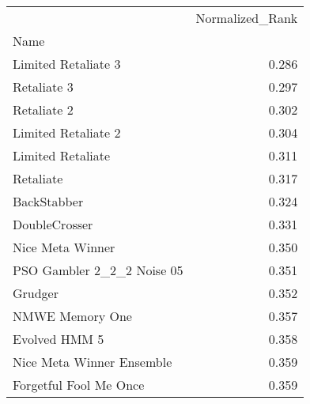 \begin{tabular}{lr}
\toprule
{} &  Normalized\_Rank \\
Name                       &                  \\
\midrule
Limited Retaliate 3        &            0.286 \\
Retaliate 3                &            0.297 \\
Retaliate 2                &            0.302 \\
Limited Retaliate 2        &            0.304 \\
Limited Retaliate          &            0.311 \\
Retaliate                  &            0.317 \\
BackStabber                &            0.324 \\
DoubleCrosser              &            0.331 \\
Nice Meta Winner           &            0.350 \\
PSO Gambler 2\_2\_2 Noise 05 &            0.351 \\
Grudger                    &            0.352 \\
NMWE Memory One            &            0.357 \\
Evolved HMM 5              &            0.358 \\
Nice Meta Winner Ensemble  &            0.359 \\
Forgetful Fool Me Once     &            0.359 \\
\bottomrule
\end{tabular}
